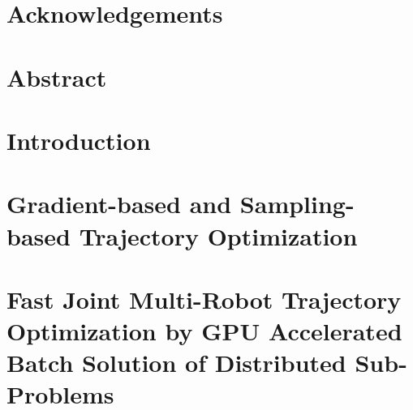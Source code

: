 \documentclass[11pt]{book}
\renewcommand{\baselinestretch}{1.2}
\begin{document}



\newpage
\thispagestyle{empty}
\renewcommand{\thesisdedication}{{\large Copyright \copyright~~Dipanwita Guhathakurta, 2023\\}{\large All Rights Reserved\\}}
\thesisdedicationpage



\newpage
\thispagestyle{empty}
\renewcommand{\thesisdedication}{One Small Step for Robot, One Giant Leap for Mankind}{\large }
\thesisdedicationpage

\mastersthesis
\renewcommand{\baselinestretch}{1.5}

\chapter*{Acknowledgements}
\label{ch:ack}


\chapter*{Abstract}
\label{ch:abstract}


\tableofcontents
\listoffigures
\listoftables


\chapter{Introduction}
\label{ch:intro}



\chapter{Gradient-based and Sampling-based Trajectory Optimization}
\label{ch:background}



\chapter{Fast Joint Multi-Robot Trajectory Optimization by GPU Accelerated Batch Solution of Distributed Sub-Problems}
\label{ch:gpu_mat}

\end{document}
